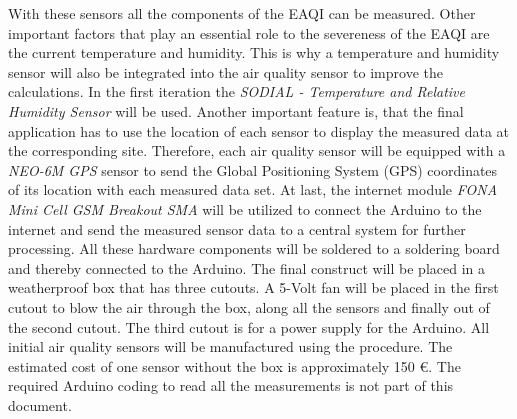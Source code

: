 \documentclass[conference]{IEEEtran}
\begin{document}
With these sensors all the components of the EAQI can be measured. Other important factors that play an essential role to the severeness of the EAQI are the current temperature and humidity. This is why a temperature and humidity sensor will also be integrated into the air quality sensor to improve the calculations. In the first iteration the \textit{SODIAL - Temperature and Relative Humidity Sensor} will be used. Another important feature is, that the final application has to use the location of each sensor to display the measured data at the corresponding site. Therefore, each air quality sensor will be equipped with a \textit{NEO-6M GPS} sensor to send the Global Positioning System (GPS) coordinates of its location with each measured data set. At last, the internet module \textit{FONA Mini Cell GSM Breakout SMA} will be utilized to connect the Arduino to the internet and send the measured sensor data to a central system for further processing. All these hardware components will be soldered to a soldering board and thereby connected to the Arduino. The final construct will be placed in a weatherproof box that has three cutouts. A 5-Volt fan will be placed in the first cutout to blow the air through the box, along all the sensors and finally out of the second cutout. The third cutout is for a power supply for the Arduino. All initial air quality sensors will be manufactured using the procedure. The estimated cost of one sensor without the box is approximately 150 \euro. The required Arduino coding to read all the measurements is not part of this document.
\end{document}
